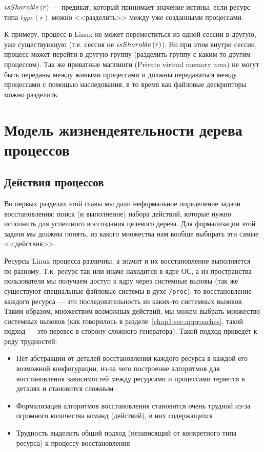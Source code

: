 \begin{defn}
\label{def:issharable}
$isSharable\left( r \right)$ --- предикат, который принимает значение истины, если ресурс типа  $type(r)$ можно <<разделить>> 
между уже созданными процессами.
\end{defn}

\begin{exmp}
К примеру, процесс в Linux не может переместиться из одной сессии в другую, уже существующую (т.е. сессия не 
$isSharable\left( r \right)$). Но при этом внутри сессии, процесс может перейти в другую группу (разделить группу с каким-то 
другим процессом). Так же приватные маппинги (Private virtual memory area) не могут быть переданы между живыми 
процессами и должны передаваться между процессами с помощью наследования, в то время как файловые дескрипторы можно разделить.
\end{exmp}

\section{Модель жизнендеятельности дерева процессов}
\label{chap2:sec:processlifemodel}

\subsection{Действия процессов}

Во первых разделах этой главы мы дали неформальное определение задачи восстановления: поиск (и выполнение) набора действий, которые нужно исполнить для успешного воссоздания целевого дерева. Для формализации этой задачи мы должны понять, из какого множества нам вообще выбирать эти самые <<действия>>.

Ресурсы Linux процесса различны, а значит и их восстановление выполняется по-разному. Т.к. ресурс так или иначе находится в ядре ОС, а из пространства пользователя мы получаем доступ к ядру через системные вызовы (так же существуют специальные файловые системы в духе \texttt{/proc}), то восстановление каждого ресурса --- это последовательность из каких-то системных вызовов. Таким образом, множеством возможных действий, мы можем выбрать множество системных вызовов (как говорилось в разделе~\ref{chap1:sec:approaches}, такой подход --- это перевес в сторону сложного генератора). Такой подход приведёт к ряду трудностей:

\begin{itemize}
	\item Нет абстракции от деталей восстановления каждого ресурса в каждой его возможной конфигурации, из-за чего построение алгоритмов для восстановления зависимостей между ресурсами и процессами теряется в деталях и становится сложным
	\item Формализация алгоритмов восстановления становится очень трудной из-за огромного количества команд (действий), в них содержащихся
	\item Трудность выделить общий подход (независящий от конкретного типа ресурса) к процессу восстановления
\end{itemize}

